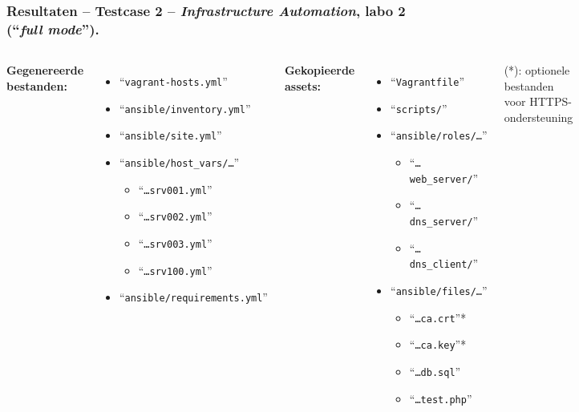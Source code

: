 \documentclass[aspectratio=169]{beamer}
\begin{document}
\begin{frame}
  \frametitle{\normalsize Resultaten -- Testcase 2 -- \emph{Infrastructure Automation}, labo 2 (``\textbf{\textcolor{hgdarkgreen}{\emph{full mode}}}'').}
  \begin{columns}[t]
    \textbf{Gegenereerde bestanden:}
    \begin{itemize}
      \item \footnotesize ``\texttt{vagrant-hosts.yml}''
      \item \footnotesize ``\texttt{ansible/inventory.yml}''
      \item \footnotesize ``\texttt{ansible/site.yml}''
      \item \footnotesize ``\texttt{ansible/host\_vars/\ldots}''
            \begin{itemize}
              \item \footnotesize ``\texttt{\ldots srv001.yml}''
              \item \footnotesize ``\texttt{\ldots srv002.yml}''
              \item \footnotesize ``\texttt{\ldots srv003.yml}''
              \item \footnotesize ``\texttt{\ldots srv100.yml}''
            \end{itemize}
      \item \footnotesize ``\texttt{ansible/requirements.yml}''
    \end{itemize}
    \bigskip
    \textbf{Gekopieerde assets:}
    \begin{itemize}
      \item \footnotesize ``\texttt{Vagrantfile}''
      \item \footnotesize ``\texttt{scripts/}''
      \item \footnotesize ``\texttt{ansible/roles/\ldots}''
            \begin{itemize}
              \item \footnotesize ``\texttt{\ldots web\_server/}''
              \item \footnotesize ``\texttt{\ldots dns\_server/}''
              \item \footnotesize ``\texttt{\ldots dns\_client/}''
            \end{itemize}
      \item \footnotesize ``\texttt{ansible/files/\ldots}''
            \begin{itemize}
              \item \footnotesize ``\texttt{\ldots ca.crt}''*
              \item \footnotesize ``\texttt{\ldots ca.key}''*
              \item \footnotesize ``\texttt{\ldots db.sql}''
              \item \footnotesize ``\texttt{\ldots test.php}''
            \end{itemize}
    \end{itemize}
    \scriptsize (*): optionele bestanden voor HTTPS-ondersteuning
  \end{columns}
\end{frame}
\end{document}
